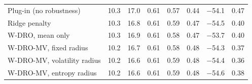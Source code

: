 \begin{tabular}{lrrrrrrr}
Plug-in (no robustness) & 10.3 & 17.0 & 0.61 & 0.57 & 0.44 & $-$54.1 & 0.47 \\
Ridge penalty & 10.3 & 16.8 & 0.61 & 0.59 & 0.47 & $-$54.5 & 0.40 \\
W-DRO, mean only & 10.3 & 16.9 & 0.61 & 0.58 & 0.47 & $-$53.7 & 0.40 \\
W-DRO-MV, fixed radius & 10.2 & 16.7 & 0.61 & 0.58 & 0.48 & $-$54.3 & 0.37 \\
W-DRO-MV, volatility radius & 10.2 & 16.6 & 0.61 & 0.59 & 0.48 & $-$54.4 & 0.36 \\
W-DRO-MV, entropy radius & 10.2 & 16.6 & 0.61 & 0.59 & 0.48 & $-$54.6 & 0.38 \\
\bottomrule
\end{tabular}
